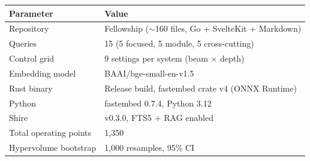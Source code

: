 \documentclass[11pt,a4paper]{article}
\begin{document}
\begin{table}[h]
\centering
\footnotesize
\begin{tabular}{ll}
\toprule
\textbf{Parameter} & \textbf{Value} \\
\midrule
Repository & Fellowship ($\sim$160 files, Go + SvelteKit + Markdown) \\
Queries & 15 (5 focused, 5 module, 5 cross-cutting) \\
Control grid & 9 settings per system (beam $\times$ depth) \\
Embedding model & BAAI/bge-small-en-v1.5 \\
Rust binary & Release build, fastembed crate v4 (ONNX Runtime) \\
Python & fastembed 0.7.4, Python 3.12 \\
Shire & v0.3.0, FTS5 + RAG enabled \\
Total operating points & 1,350 \\
Hypervolume bootstrap & 1,000 resamples, 95\% CI \\
\bottomrule
\end{tabular}
\end{table}
\end{document}
